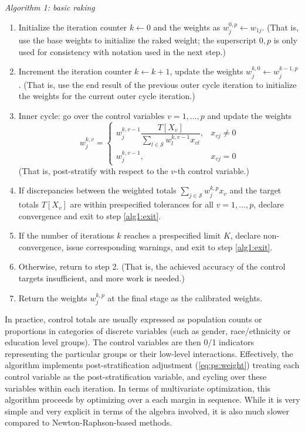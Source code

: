 {\it Algorithm 1: basic raking}
\begin{enumerate}
    \item Initialize the iteration counter $k\leftarrow 0$
          and the weights as $w_j^{0,p} \leftarrow w_{1j}$.
          (That is, use the base weights to initialize the raked weight;
          the superscript $0,p$ is only used for consistency with notation
          used in the next step.)
    \item Increment the iteration counter $k \leftarrow k+1$,
          update the weights $w_j^{k,0} \leftarrow w_j^{k-1,p}$.
          (That is, use the end result of the previous outer cycle iteration
          to initialize the weights for the current outer cycle iteration.)
    \item Inner cycle: go over the control variables $v=1,\ldots,p$ and update the weights
          $$
            w_j^{k,v} =
                \left\{
                \begin{array}{ll}
                    w_j^{k,v-1} \dfrac{ T[X_v] }{ \sum_{l \in \mathcal{S}} w_l^{k,v-1} x_{vl} },
                        & x_{vj} \neq 0 \\
                    w_j^{k,v-1},
                        & x_{vj} = 0
                \end{array}
                \right.
          $$
          (That is, post-stratify with respect to the $v$-th control variable.)
    \item If discrepancies between the weighted totals $\sum_{j \in \mathcal{S}} w_j^{k,p} x_v$
          and the target totals $T[X_v]$ are within prespecified tolerances for all
          $v=1,\ldots,p$, declare convergence and exit to step \ref{alg1:exit}.
    \item If the number of iterations $k$ reaches a prespecified limit $K$,
          declare non-convergence, issue corresponding warnings, and exit to step \ref{alg1:exit}.
    \item Otherwise, return to step 2. (That is, the achieved accuracy of the control targets
          insufficient, and more work is needed.)
    \item Return the weights $w_j^{k,p}$ at the final stage as the calibrated weights.
            \label{alg1:exit}
\end{enumerate}


In practice, control totals are usually expressed as population counts
or proportions in categories of discrete variables (such as gender,
race/ethnicity or education level groups).
The control variables are then 0/1 indicators representing the particular groups
or their low-level interactions.
Effectively, the algorithm implements post-stratification adjustment
(\ref{eq:ps:weight}) treating each control variable as the post-stratification
variable, and cycling over these variables within each iteration.
In terms of multivariate optimization,
this algorithm proceeds by optimizing over a each margin in sequence.
While it is very simple and very explicit in terms
of the algebra involved, it is also much slower compared
to Newton-Raphson-based methods.

